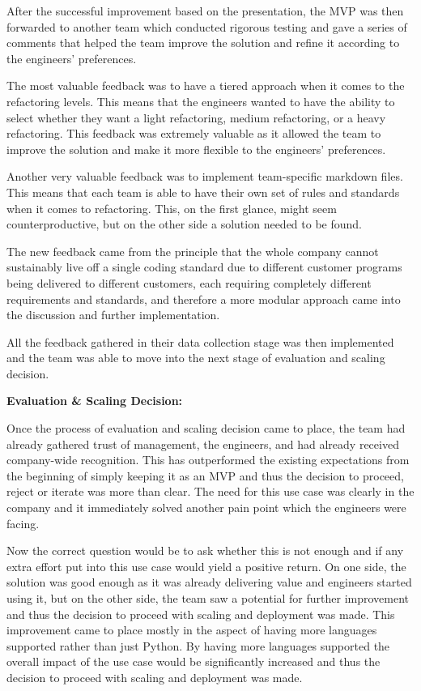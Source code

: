 \documentclass[]{imc-inf}
\begin{document}
After the successful improvement based on the presentation, the MVP was then forwarded to another team which conducted rigorous testing and gave a series of comments that helped the team improve the solution and refine it according to the engineers' preferences.

The most valuable feedback was to have a tiered approach when it comes to the refactoring levels. This means that the engineers wanted to have the ability to select whether they want a light refactoring, medium refactoring, or a heavy refactoring. This feedback was extremely valuable as it allowed the team to improve the solution and make it more flexible to the engineers' preferences.

Another very valuable feedback was to implement team-specific markdown files. This means that each team is able to have their own set of rules and standards when it comes to refactoring. This, on the first glance, might seem counterproductive, but on the other side a solution needed to be found.

The new feedback came from the principle that the whole company cannot sustainably live off a single coding standard due to different customer programs being delivered to different customers, each requiring completely different requirements and standards, and therefore a more modular approach came into the discussion and further implementation. 

All the feedback gathered in their data collection stage was then implemented and the team was able to move into the next stage of evaluation and scaling decision.

\textbf{Evaluation \& Scaling Decision:}

Once the process of evaluation and scaling decision came to place, the team had already gathered trust of management, the engineers, and had already received company-wide recognition. This has outperformed the existing expectations from the beginning of simply keeping it as an MVP and thus the decision to proceed, reject or iterate was more than clear. The need for this use case was clearly in the company and it immediately solved another pain point which the engineers were facing.

Now the correct question would be to ask whether this is not enough and if any extra effort put into this use case would yield a positive return. On one side, the solution was good enough as it was already delivering value and engineers started using it, but on the other side, the team saw a potential for further improvement and thus the decision to proceed with scaling and deployment was made. This improvement came to place mostly in the aspect of having more languages supported rather than just Python. By having more languages supported the overall impact of the use case would be significantly increased and thus the decision to proceed with scaling and deployment was made.
\end{document}
